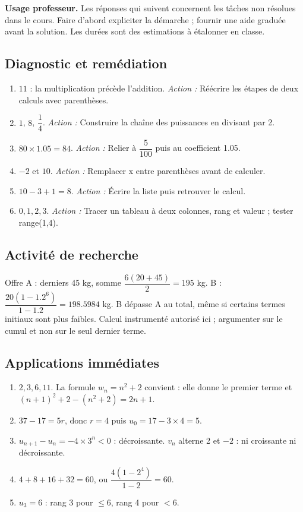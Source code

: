 \label{C01-CORR}
\textbf{Usage professeur.} Les réponses qui suivent concernent les tâches non résolues dans le cours. Faire d’abord expliciter la démarche ; fournir une aide graduée avant la solution. Les durées sont des estimations à étalonner en classe.
\subsection*{Diagnostic et remédiation}
\begin{enumerate}
\item $11$ : la multiplication précède l’addition. \textit{Action :} Réécrire les étapes de deux calculs avec parenthèses.
\item $1$, $8$, $\dfrac{1}{4}$. \textit{Action :} Construire la chaîne des puissances en divisant par 2.
\item $80\times\num{1,05}=84$. \textit{Action :} Relier  à $\dfrac{5}{100}$ puis au coefficient \num{1,05}.
\item $-2$ et $10$. \textit{Action :} Remplacer x entre parenthèses avant de calculer.
\item $10-3+1=8$. \textit{Action :} Écrire la liste puis retrouver le calcul.
\item $0,1,2,3$. \textit{Action :} Tracer un tableau à deux colonnes, rang et valeur ; tester range(1,4).
\end{enumerate}
\subsection*{Activité de recherche}
Offre A : derniers 45 kg, somme $\dfrac{6(20+45)}{2}=195$ kg. B : $\dfrac{20(1-\num{1,2}^6)}{1-\num{1,2}}=\num{198,5984}$ kg. B dépasse A au total, même si certains termes initiaux sont plus faibles. Calcul instrumenté autorisé ici ; argumenter sur le cumul et non sur le seul dernier terme.
\subsection*{Applications immédiates}
\begin{enumerate}
\item $2,3,6,11$. La formule $w_n=n^2+2$ convient : elle donne le premier terme et $(n+1)^2+2-(n^2+2)=2n+1$.
\item $37-17=5r$, donc $r=4$ puis $u_0=17-3\times4=5$.
\item $u_{n+1}-u_n=-4\times3^n<0$ : décroissante. $v_n$ alterne 2 et $-2$ : ni croissante ni décroissante.
\item $4+8+16+32=60$, ou $\dfrac{4(1-2^4)}{1-2}=60$.
\item $u_3=6$ : rang 3 pour $\leq6$, rang 4 pour $<6$.
\end{enumerate}
